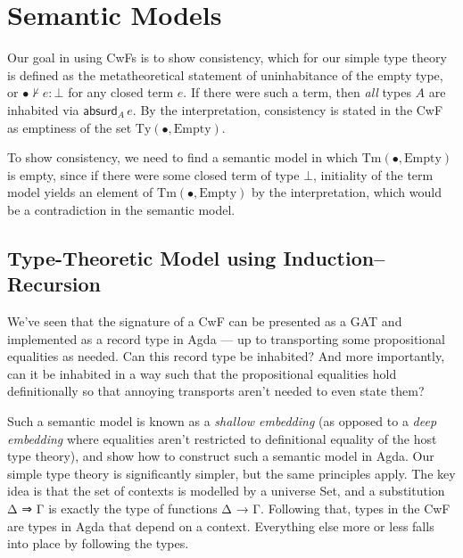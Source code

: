 \documentclass{article}
\renewcommand{\_}{\textrm{\textscale{.5}{\textunderscore}}}
\newcommand{\Tm}{\mathrm{Tm}}
\newcommand{\Ty}{\mathrm{Ty}}
\newcommand{\Empty}{\mathrm{Empty}}
\newcommand{\absurd}[2]{\mathsf{absurd}_{#1}\,#2}
\theoremstyle{definition}
\theoremstyle{plain}
\begin{document}
\section{Semantic Models}

Our goal in using CwFs is to show consistency,
which for our simple type theory is defined as the metatheoretical statement
of uninhabitance of the empty type, or $\bullet \nvdash e : \bot$ for any closed term $e$.
If there were such a term, then \emph{all} types $A$ are inhabited via $\absurd{A}{e}$.
By the interpretation, consistency is stated in the CwF as emptiness of the set $\Ty(\bullet, \Empty)$.

To show consistency, we need to find a semantic model in which $\Tm(\bullet, \Empty)$ is empty,
since if there were some closed term of type $\bot$,
initiality of the term model yields an element of $\Tm(\bullet, \Empty)$ by the interpretation,
which would be a contradiction in the semantic model.

\subsection{Type-Theoretic Model using Induction--Recursion}

We've seen that the signature of a CwF can be presented as a GAT and implemented as a record type in Agda
--- up to transporting some propositional equalities as needed.
Can this record type be inhabited?
And more importantly, can it be inhabited in a way such that the propositional equalities hold definitionally
so that annoying transports aren't needed to even state them?

Such a semantic model is known as a \emph{shallow embedding}
(as opposed to a \emph{deep embedding} where equalities aren't restricted to definitional equality of the host type theory),
and \citet{shallow} show how to construct such a semantic model in Agda.
Our simple type theory is significantly simpler, but the same principles apply.
The key idea is that the set of contexts is modelled by a universe {\codefont Set},
and a substitution {\codefont Δ ⇒ Γ} is exactly the type of functions {\codefont Δ → Γ}.
Following that, types in the CwF are types in Agda that depend on a context.
Everything else more or less falls into place by following the types.
\end{document}
